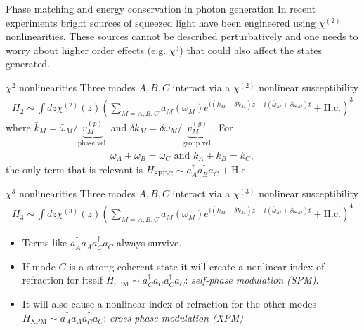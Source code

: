 \documentclass[final]{beamer} %
\newcommand{\hc}{\mathrm{H.c.}}
\newcommand{\ks}[1]{\bar k_{#1}+\delta k_{#1}}
\newcommand{\ws}[1]{\bar \omega_{#1}+\delta \omega_{#1}}
\begin{document}
\begin{frame}[t]
\begin{columns}[t]
\begin{column}{0.33\paperwidth}
\begin{alertblock}{Phase matching  and energy conservation in photon generation}
In recent experiments \cite{harder,lemieux} bright sources of squeezed light have been engineered using $\chi^{(2)}$ nonlinearities. These sources cannot be described perturbatively and one needs to worry about higher order effects (e.g. $\chi^{3}$) that could also affect the states generated.
\begin{block}{$\chi^2$ nonlinearities}
Three modes $A,B,C$ interact via a $\chi^{(2)}$ nonlinear susceptibility
\begin{align*}
H_2\sim\int dz \chi^{(2)}(z) \left( \sum_{M=A,B,C} a_M(\omega_M)e^{i (\ks{M})z-i (\ws{M}) t} + \hc \right)^{3}
\end{align*}
where $\bar k_M = \bar \omega_M/\underbrace{v_M^{(p)}}_{\text{phase vel.}}$ and $\delta k_M = \delta \omega_M/\underbrace{v_M^{(g)}}_{\text{group vel.}}$.
For
\begin{align*}
\bar \omega_A + \bar \omega_B = \bar \omega_C \text{ and }  \bar k_A + \bar k_B = \bar k_C ,
\end{align*} 
the only term that is relevant is $H_{\text{SPDC}}\sim a_A ^\dagger a_B^\dagger a_C+\hc$
\end{block}
\begin{block}{$\chi^3$ nonlinearities}
Three modes $A,B,C$ interact via a $\chi^{(3)}$ nonlinear susceptibility
\begin{align*}
H_3\sim \int dz \chi^{(3)}(z) \left( \sum_{M=A,B,C} a_M(\omega_M)e^{i (\ks{M})z-i (\ws{M}) t} + \hc \right)^{4}
\end{align*}
\begin{itemize} 
\item \textcolor{brownish}{Terms like $a_A^\dagger a_A a_C^\dagger a_C $ always survive.}
\item If mode $C$ is a strong coherent state it will create a nonlinear index of refraction for itself $H_{\text{SPM}} \sim a_C^\dagger a_C a^\dagger_C a_C$: \emph{self-phase modulation (SPM)}.
\item It will also cause a nonlinear index of refraction for the other modes $H_{\text{XPM}} \sim a_A^\dagger a_A a^\dagger_C a_C$: \emph{cross-phase modulation (XPM)}
\end{itemize}
\end{block}
\end{alertblock}

\end{column}



\end{columns}
\end{frame}
\end{document}
